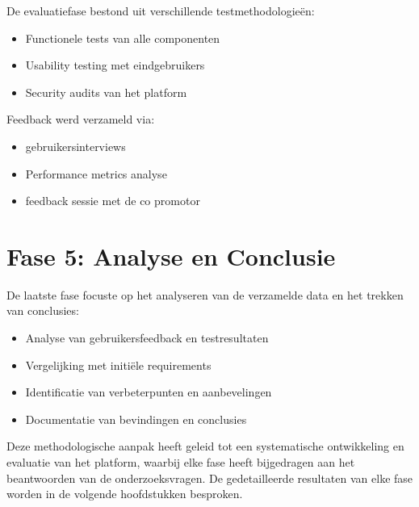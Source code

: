 De evaluatiefase bestond uit verschillende testmethodologieën:

\begin{itemize}
    \item Functionele tests van alle componenten
    \item Usability testing met eindgebruikers
    \item Security audits van het platform
\end{itemize}

Feedback werd verzameld via:
\begin{itemize}
    \item gebruikersinterviews
    \item Performance metrics analyse
    \item feedback sessie met de co promotor
\end{itemize}

\section{Fase 5: Analyse en Conclusie}
\label{sec:fase5}

De laatste fase focuste op het analyseren van de verzamelde data en het trekken van conclusies:

\begin{itemize}
    \item Analyse van gebruikersfeedback en testresultaten
    \item Vergelijking met initiële requirements
    \item Identificatie van verbeterpunten en aanbevelingen
    \item Documentatie van bevindingen en conclusies
\end{itemize}

Deze methodologische aanpak heeft geleid tot een systematische ontwikkeling en evaluatie van het platform, waarbij elke fase heeft bijgedragen aan het beantwoorden van de onderzoeksvragen. De gedetailleerde resultaten van elke fase worden in de volgende hoofdstukken besproken.


